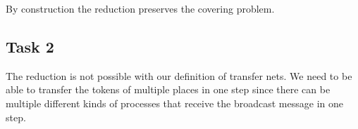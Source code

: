 By construction the reduction preserves the covering problem.

\subsection{Task 2}
The reduction is not possible with our definition of transfer nets. We need to be able to transfer the tokens of multiple places in one step since there can be multiple different kinds of processes that receive the broadcast message in one step.
